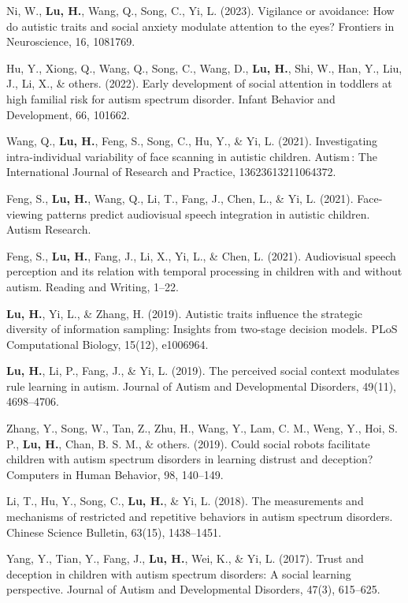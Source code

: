 \newcommand{\Revision}{\textit{Under revision}}
\newcommand{\Review}{\textit{Under review}}
\newcommand{\Submitted}{\textit{Submitted}}
\newcommand{\Manuscript}{\textit{Preparing manuscript}}
\newcommand{\CS}{*} %
\newcommand{\CF}{\textsuperscript{\#}} %
\newcommand{\ME}{\textbf{Lu, H.}}


\begin{etaremune}
  \item Ni, W., \ME, Wang, Q., Song, C., Yi, L. (2023). Vigilance or avoidance: How do autistic traits and social anxiety modulate attention to the eyes? Frontiers in Neuroscience, 16, 1081769.
  \item Hu, Y., Xiong, Q., Wang, Q., Song, C., Wang, D., \ME, Shi, W., Han, Y., Liu, J., Li, X., \& others. (2022). Early development of social attention in toddlers at high familial risk for autism spectrum disorder. Infant Behavior and Development, 66, 101662.
  \item Wang, Q., \ME, Feng, S., Song, C., Hu, Y., \& Yi, L. (2021). Investigating intra-individual variability of face scanning in autistic children. Autism : The International Journal of Research and Practice, 13623613211064372.
  \item Feng, S., \ME, Wang, Q., Li, T., Fang, J., Chen, L., \& Yi, L. (2021). Face-viewing patterns predict audiovisual speech integration in autistic children. Autism Research.
  \item Feng, S., \ME, Fang, J., Li, X., Yi, L., \& Chen, L. (2021). Audiovisual speech perception and its relation with temporal processing in children with and without autism. Reading and Writing, 1–22.
  \item \ME, Yi, L., \& Zhang, H. (2019). Autistic traits influence the strategic diversity of information sampling: Insights from two-stage decision models. PLoS Computational Biology, 15(12), e1006964.
  \item \ME, Li, P., Fang, J., \& Yi, L. (2019). The perceived social context modulates rule learning in autism. Journal of Autism and Developmental Disorders, 49(11), 4698–4706.
  \item Zhang, Y., Song, W., Tan, Z., Zhu, H., Wang, Y., Lam, C. M., Weng, Y., Hoi, S. P., \ME, Chan, B. S. M., \& others. (2019). Could social robots facilitate children with autism spectrum disorders in learning distrust and deception? Computers in Human Behavior, 98, 140–149.
  \item Li, T., Hu, Y., Song, C., \ME, \& Yi, L. (2018). The measurements and mechanisms of restricted and repetitive behaviors in autism spectrum disorders. Chinese Science Bulletin, 63(15), 1438–1451.
  \item Yang, Y., Tian, Y., Fang, J., \ME, Wei, K., \& Yi, L. (2017). Trust and deception in children with autism spectrum disorders: A social learning perspective. Journal of Autism and Developmental Disorders, 47(3), 615–625.

\end{etaremune}
